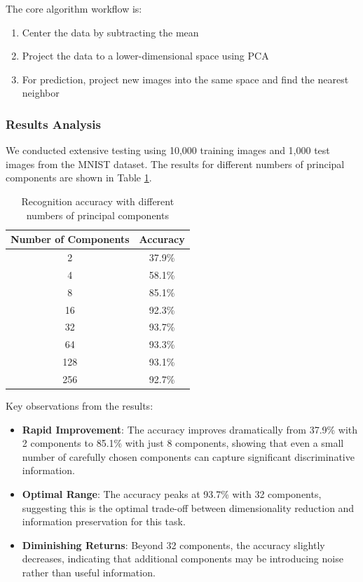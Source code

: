 \documentclass[11pt,a4paper]{article}
\begin{document}
The core algorithm workflow is:

\begin{enumerate}
    \item Center the data by subtracting the mean
    \item Project the data to a lower-dimensional space using PCA
    \item For prediction, project new images into the same space and find the nearest neighbor
\end{enumerate}

\subsubsection{Results Analysis}
We conducted extensive testing using 10,000 training images and 1,000 test images from the MNIST dataset. The results for different numbers of principal components are shown in Table \ref{table:mnist_accuracy}.

\begin{table}[H]
    \centering
    \begin{tabular}{|c|c|}
        \hline
        \rowcolor{bluePoli!40}
        \textbf{Number of Components} & \textbf{Accuracy} \T\B \\
        \hline
        2 & 37.9\% \T\B \\
        4 & 58.1\% \T\B \\
        8 & 85.1\% \T\B \\
        16 & 92.3\% \T\B \\
        32 & 93.7\% \T\B \\
        64 & 93.3\% \T\B \\
        128 & 93.1\% \T\B \\
        256 & 92.7\% \B \\
        \hline
    \end{tabular}
    \caption{Recognition accuracy with different numbers of principal components}
    \label{table:mnist_accuracy}
\end{table}

Key observations from the results:

\begin{itemize}
    \item \textbf{Rapid Improvement}: The accuracy improves dramatically from 37.9\% with 2 components to 85.1\% with just 8 components, showing that even a small number of carefully chosen components can capture significant discriminative information.
    
    \item \textbf{Optimal Range}: The accuracy peaks at 93.7\% with 32 components, suggesting this is the optimal trade-off between dimensionality reduction and information preservation for this task.
    
    \item \textbf{Diminishing Returns}: Beyond 32 components, the accuracy slightly decreases, indicating that additional components may be introducing noise rather than useful information.
\end{itemize}
\end{document}
